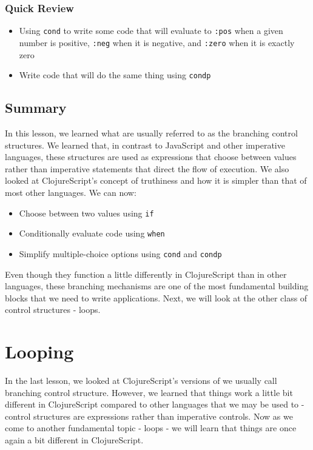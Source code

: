 \documentclass[10pt,twoside,openright]{memoir}
\begin{document}
\subsection{Quick Review}

\begin{itemize}
\tightlist
\item
  Using \texttt{cond} to write some code that will evaluate to
  \texttt{:pos} when a given number is positive, \texttt{:neg} when it
  is negative, and \texttt{:zero} when it is exactly zero
\item
  Write code that will do the same thing using \texttt{condp}
\end{itemize}


\section{Summary}

In this lesson, we learned what are usually referred to as the branching
control structures. We learned that, in contrast to JavaScript and other
imperative languages, these structures are used as expressions that
choose between values rather than imperative statements that direct the
flow of execution. We also looked at ClojureScript's concept of
truthiness and how it is simpler than that of most other languages. We
can now:

\begin{itemize}
\tightlist
\item
  Choose between two values using \texttt{if}
\item
  Conditionally evaluate code using \texttt{when}
\item
  Simplify multiple-choice options using \texttt{cond} and
  \texttt{condp}
\end{itemize}

Even though they function a little differently in ClojureScript than in
other languages, these branching mechanisms are one of the most
fundamental building blocks that we need to write applications. Next, we
will look at the other class of control structures - loops.

\chapter{Looping}

In the last lesson, we looked at ClojureScript's versions of we usually
call branching control structure. However, we learned that things work a
little bit different in ClojureScript compared to other languages that
we may be used to - control structures are expressions rather than
imperative controls. Now as we come to another fundamental topic - loops
- we will learn that things are once again a bit different in
ClojureScript.
\end{document}
